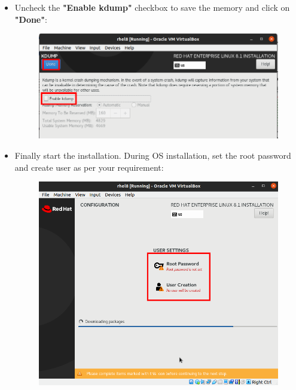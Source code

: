 \begin{flushleft}
\begin{itemize}
	\item Uncheck the \textbf{"Enable kdump"} checkbox to save the memory and click on \textbf{"Done"}:
	\begin{figure}[h!]
		\centering
		\includegraphics[scale=.3]{content/chapter18/images/kdump.png}
	\end{figure}			

	\item Finally start the installation. During OS installation, set the root password and create user as per your requirement:
	\begin{figure}[h!]
		\centering
		\includegraphics[scale=.25]{content/chapter18/images/server6.png}
	\end{figure}		


 \end{itemize}

\end{flushleft}
\newpage

\afterpage{\blankpage}
